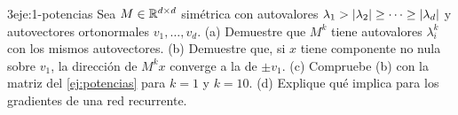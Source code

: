 \begin{ejercicio}{3}{eje:1-potencias}
Sea $M\in\mathbb{R}^{d\times d}$ simétrica con autovalores $\lambda_1>\lvert\lambda_2\rvert\ge\dots\ge\lvert\lambda_d\rvert$ y autovectores ortonormales $v_1,\dots,v_d$. (a) Demuestre que $M^{k}$ tiene autovalores $\lambda_i^{k}$ con los mismos autovectores. (b) Demuestre que, si $x$ tiene componente no nula sobre $v_1$, la dirección de $M^{k}x$ converge a la de $\pm v_1$. (c) Compruebe (b) con la matriz del \cref{ej:potencias} para $k=1$ y $k=10$. (d) Explique qué implica para los gradientes de una red recurrente.
\end{ejercicio}
